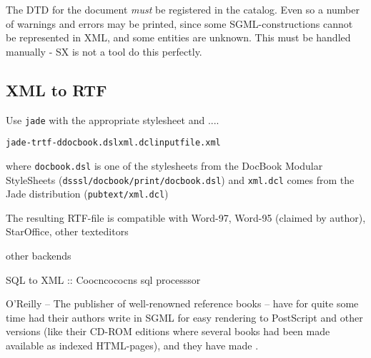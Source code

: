 The DTD for the document \textit{must} be registered in the
\textsf{catalog}.  Even so a number of warnings and errors may be
printed, since some SGML-constructions cannot be represented in XML,
and some entities are unknown.  This must be handled manually - SX is
not a tool do this perfectly.


\subsection{XML to RTF}
\label{sec:docbook-xml-to-rtf}

Use \texttt{jade} with the appropriate stylesheet and \textsf{....}

\begin{alltt}
         jade -t rtf -d docbook.dsl xml.dcl inputfile.xml
\end{alltt}

where \texttt{docbook.dsl} is one of the stylesheets from the
\textsf{DocBook Modular StyleSheets}
(\texttt{dsssl/docbook/print/docbook.dsl}) and \texttt{xml.dcl} comes
from the Jade distribution (\texttt{pubtext/xml.dcl})

The resulting RTF-file is compatible with Word-97, Word-95 (claimed by
author), StarOffice, \textsf{other texteditors} 

\textsf{other backends}

SQL to XML :: Coocncococns sql processsor


O'Reilly -- The publisher of well-renowned reference books -- have for
quite some time had their authors write in SGML for easy rendering to
PostScript and other versions (like their CD-ROM editions where
several books had been made available as indexed HTML-pages), and they
have made
.


